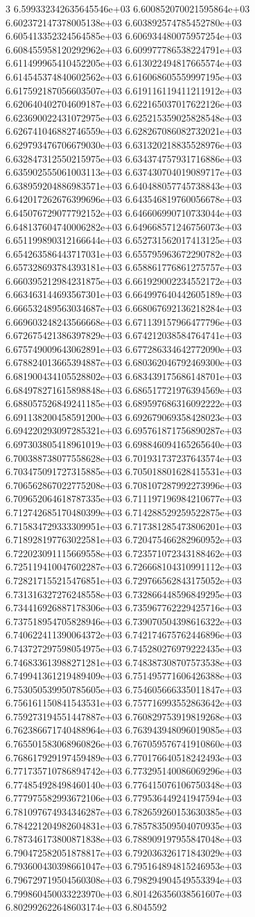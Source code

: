 3	6.599332342635645546e+03	6.600852070021595864e+03	6.602372147378005138e+03	6.603892574785452780e+03	6.605413352324564585e+03	6.606934480075957254e+03	6.608455958120292962e+03	6.609977786538224791e+03	6.611499965410452205e+03	6.613022494817665574e+03	6.614545374840602562e+03	6.616068605559997195e+03	6.617592187056603507e+03	6.619116119411211912e+03	6.620640402704609187e+03	6.622165037017622126e+03	6.623690022431072975e+03	6.625215359025828548e+03	6.626741046882746559e+03	6.628267086082732021e+03	6.629793476706679030e+03	6.631320218835528976e+03	6.632847312550215975e+03	6.634374757931716886e+03	6.635902555061003113e+03	6.637430704019089717e+03	6.638959204886983571e+03	6.640488057745738843e+03	6.642017262676399696e+03	6.643546819760056678e+03	6.645076729077792152e+03	6.646606990710733044e+03	6.648137604740006282e+03	6.649668571246756073e+03	6.651199890312166644e+03	6.652731562017413125e+03	6.654263586443717031e+03	6.655795963672290782e+03	6.657328693784393181e+03	6.658861776861275757e+03	6.660395212984231875e+03	6.661929002234552172e+03	6.663463144693567301e+03	6.664997640442605189e+03	6.666532489563034687e+03	6.668067692136218284e+03	6.669603248243566668e+03	6.671139157966477796e+03	6.672675421386397829e+03	6.674212038584764741e+03	6.675749009643062891e+03	6.677286334642772090e+03	6.678824013665394887e+03	6.680362046792469300e+03	6.681900434105528802e+03	6.683439175686148701e+03	6.684978271615898848e+03	6.686517721976394569e+03	6.688057526849241185e+03	6.689597686316092222e+03	6.691138200458591200e+03	6.692679069358428023e+03	6.694220293097285321e+03	6.695761871756890287e+03	6.697303805418961019e+03	6.698846094165265640e+03	6.700388738077558628e+03	6.701931737237643574e+03	6.703475091727315885e+03	6.705018801628415531e+03	6.706562867022775208e+03	6.708107287992273996e+03	6.709652064618787335e+03	6.711197196984210677e+03	6.712742685170480399e+03	6.714288529259522875e+03	6.715834729333309951e+03	6.717381285473806201e+03	6.718928197763022581e+03	6.720475466282960952e+03	6.722023091115669558e+03	6.723571072343188462e+03	6.725119410047602287e+03	6.726668104310991112e+03	6.728217155215476851e+03	6.729766562843175052e+03	6.731316327276248558e+03	6.732866448596849295e+03	6.734416926887178306e+03	6.735967762229425716e+03	6.737518954705828946e+03	6.739070504398616322e+03	6.740622411390064372e+03	6.742174675762446896e+03	6.743727297598054975e+03	6.745280276979222435e+03	6.746833613988271281e+03	6.748387308707573538e+03	6.749941361219489409e+03	6.751495771606426388e+03	6.753050539950785605e+03	6.754605666335011847e+03	6.756161150841543531e+03	6.757716993552863642e+03	6.759273194551447887e+03	6.760829753919819268e+03	6.762386671740488964e+03	6.763943948096019085e+03	6.765501583068960826e+03	6.767059576741910860e+03	6.768617929197459489e+03	6.770176640518242493e+03	6.771735710786894742e+03	6.773295140086069296e+03	6.774854928498460140e+03	6.776415076106750348e+03	6.777975582993672106e+03	6.779536449241947594e+03	6.781097674934346287e+03	6.782659260153630385e+03	6.784221204982604831e+03	6.785783509504070935e+03	6.787346173800871838e+03	6.788909197955847048e+03	6.790472582051878817e+03	6.792036326171843029e+03	6.793600430398661047e+03	6.795164894815246953e+03	6.796729719504560308e+03	6.798294904549553394e+03	6.799860450033223970e+03	6.801426356038561607e+03	6.802992622648603174e+03	6.8045592